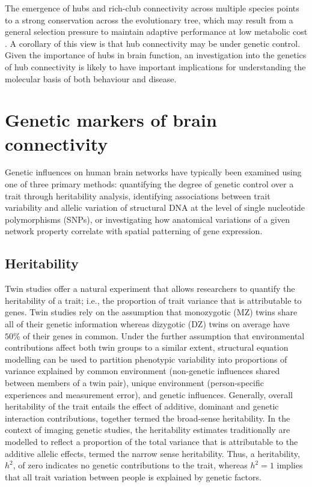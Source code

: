 The emergence of hubs and rich-club connectivity across multiple species points to a strong conservation across the evolutionary tree, which may result from a general selection pressure to maintain adaptive performance at low metabolic cost \citep{Bullmore2012}. A corollary of this view is that hub connectivity may be under genetic control. Given the importance of hubs in brain function, an investigation into the genetics of hub connectivity is likely to have important implications for understanding the molecular basis of both behaviour and disease. 
\section{Genetic markers of brain connectivity}

Genetic influences on human brain networks have typically been examined using one of three primary methods: quantifying the degree of genetic control over a trait through heritability analysis, identifying associations between trait variability and allelic variation of structural DNA at the level of single nucleotide polymorphisms (SNPs), or investigating how anatomical variations of a given network property correlate with spatial patterning of gene expression. 

\subsection{Heritability}

Twin studies offer a natural experiment that allows researchers to quantify the heritability of a trait; i.e., the proportion of trait variance that is attributable to genes. Twin studies rely on the assumption that monozygotic (MZ) twins share all of their genetic information whereas dizygotic (DZ) twins on average have $50\%$ of their genes in common. Under the further assumption that environmental contributions affect both twin groups to a similar extent, structural equation modelling can be used to partition phenotypic variability into proportions of variance explained by common environment (non-genetic influences shared between members of a twin pair), unique environment (person-specific experiences and measurement error), and genetic influences. Generally, overall heritability of the trait entails the effect of additive, dominant and genetic interaction contributions, together termed the broad-sense heritability. In the context of imaging genetic studies, the heritability estimates traditionally are modelled to reflect a proportion of the total variance that is attributable to the additive allelic effects, termed the narrow sense heritability. Thus, a heritability, $h^{2}$, of zero indicates no genetic contributions to the trait, whereas $h^{2}=1$ implies that all trait variation between people is explained by genetic factors.

